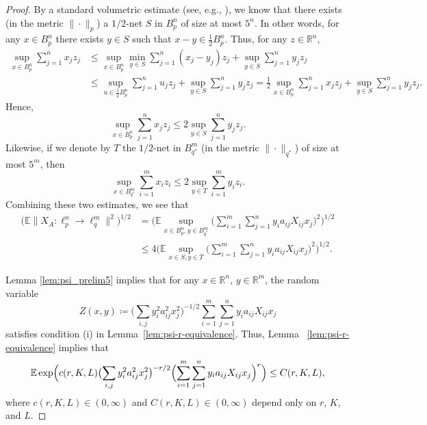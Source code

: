 \documentclass[a4paper]{amsart}
\theoremstyle{definition}
\theoremstyle{remark}
\numberwithin{equation}{section}
\newcommand*{\RR}{\mathbb{R}}
\newcommand*{\EE}{\mathbb{E}}
\begin{document}
\begin{proof}
	By a standard volumetric estimate (see, e.g., \cite[Corollary~4.2.13]{V2018}),
	we know that there exists (in the metric $\|\cdot\|_p$) a $1/2$-net $S$   in $B_p^n$ of size at most $5^n$.
	In other words, for any $x\in B_p^n$ there exists $y\in S$ such that $x-y \in \frac{1}{2} B_p^n$.
		Thus, for any $z\in\RR^n$,
		\begin{align*}
			\sup_{x\in B_p^n} \sum_{j=1}^n x_jz_j
			&\leq \sup_{x\in B_p^n} \min_{y\in S} \sum_{j=1}^n (x_j-y_j) z_j  + \sup_{y\in S} \sum_{j=1}^n y_j z_j \\
      	&\leq \sup_{u\in \frac{1}{2} B_p^n} \sum_{j=1}^n u_j z_j  + \sup_{y\in S} \sum_{j=1}^n y_j z_j      	= 	 \frac{1}{2}\sup_{x\in  B_p^n} \sum_{j=1}^n x_j z_j  + \sup_{y\in S} \sum_{j=1}^n y_j z_j .
		\end{align*}
	Hence,
	\begin{equation}	\label{eq:eps-nets1}
	\sup_{x\in B_p^n} \sum_{j=1}^n x_jz_j \leq 2 \sup_{y\in S} \sum_{j=1}^n y_j z_j .
	\end{equation}
	Likewise, if we denote by $T$ the $1/2$-net in $B_{q^*}^m$ (in the metric $\|\cdot\|_{q^*}$)  of size at most $5^m$,
	then
	\begin{equation}	\label{eq:eps-nets2}
	\sup_{x\in B_{q^*}^m} \sum_{i=1}^m x_iz_i \leq 2 \sup_{y\in T} \sum_{i=1}^m y_i z_i .
	\end{equation}
	Combining these two estimates, we see that
	\begin{align}
		\label{eq:lc-prelim-bound-1}
		\bigl(\EE \|X_A\colon \ell_{p}^n\to\ell_q^m\|^2\bigr)^{1/2}
		&= \bigl(
		\EE \sup_{x\in B_p^n, y\in B_{q^*}^m} \bigl( \sum_{i=1}^m \sum_{j=1}^n  y_i a_{ij} X_{ij} x_j\bigr)^2
		\bigr)^{1/2} \\
			& \leq 4			\bigl(\EE \sup_{x\in S, y\in T} \bigl( \sum_{i=1}^m \sum_{j=1}^n  y_i a_{ij} X_{ij} x_j\bigr)^2\bigr)^{1/2}.\nonumber
				\end{align}

	
    Lemma \ref{lem:psi_prelim5} implies that for any $x\in\RR^n$, $y\in\RR^m$, the random variable
   	\[
   		Z(x,y)\coloneqq \bigl(\sum_{i,j} y_i^2a_{ij}^2x_j^2 \bigr)^{-1/2}  \sum_{i=1}^m \sum_{j=1}^n  y_i a_{ij} X_{ij} x_j
	\]
	satisfies condition (i) in Lemma~\ref{lem:psi-r-equivalence}.
   Thus, Lemma~ \ref{lem:psi-r-equivalence} implies that
   	\begin{equation}	\label{eq:lc-prelim-bound-2}
		\EE  \exp\Bigl( c(r,K,L)  \bigl(\sum_{i,j} y_i^2a_{ij}^2x_j^2 \bigr)^{-r/2} \Bigl( \sum_{i=1}^m \sum_{j=1}^n  y_i a_{ij} X_{ij} x_j\Bigr)^{r}\Bigr) \le C(r,K,L),
	\end{equation}
	where $c(r,K,L) \in(0,\infty)$ and $C(r,K,L) \in(0,\infty)$ depend only on $r$, $K$, and $L$.
	



\end{proof}
\end{document}
